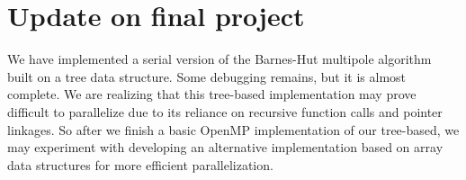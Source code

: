 \documentclass{article}
\begin{document}
\section{Update on final project}
We have implemented a serial version of the Barnes-Hut multipole algorithm built on a tree data structure. Some debugging remains, but it is almost complete. We are realizing that this tree-based implementation may prove difficult to parallelize due to its reliance on recursive function calls and pointer linkages. So after we finish a basic OpenMP implementation of our tree-based, we may experiment with developing an alternative implementation based on array data structures for more efficient parallelization.
\end{document}
